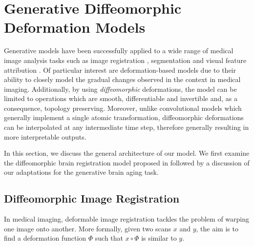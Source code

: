 \chapter{Generative Diffeomorphic Deformation Models}
Generative models have been successfully applied to a wide range of medical image analysis tasks such as image registration \cite{balakrishnan2019voxelmorph}, segmentation \cite{dong2017automatic} and visual feature attribution \cite{baumgartner2018visual}. Of particular interest are deformation-based models due to their ability to closely model the gradual changes observed in the context in medical imaging.
Additionally, by using \textit{diffeomorphic} deformations, the model can be limited to operations which are smooth, differentiable and invertible and, as a consequence, topology preserving.
Moreover, unlike convolutional models which generally implement a single atomic transformation, diffeomorphic deformations can be interpolated at any intermediate time step, therefore generally resulting in more interpretable outputs.



In this section, we discuss the general architecture of our model. We first examine the diffeomorphic brain registration model proposed in \cite{balakrishnan2019voxelmorph} \cite{dalca2018unsupervised} followed by a discussion of our adaptations for the generative brain aging task.

\section{Diffeomorphic Image Registration}
\label{chap:voxelmorph}
In medical imaging, deformable image registration tackles the problem of warping one image onto another. More formally, given two scans $x$ and $y$, the aim is to find a deformation function $\Phi$ such that $x \circ \Phi$ is similar to $y$.

